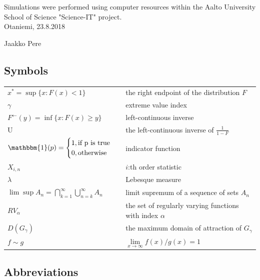 \documentclass[english,12pt,a4paper,pdftex,sci,utf8]{aaltothesis} %
\begin{document}


Simulations were performed using computer resources within the Aalto University School of Science "Science-IT" project.\\

\vspace{5cm}
Otaniemi, 23.8.2018

\vspace{5mm}
{\hfill Jaakko Pere \hspace{1cm}}

\newpage


\thesistableofcontents



\subsection*{Symbols}

\begin{tabular}{ll}
$x^*=\sup\{x : F(x)<1\}$  & the right endpoint of the distribution $F$ \\
$\gamma$ & extreme value index \\
$F^{\leftarrow}(y) = \inf\{x:F(x) \geq y \}$ & left-continuous inverse \\
U & the left-continuous inverse of $\frac{1}{1-F}$ \\
$\mathbbm{1}(p)=
\begin{cases}
1 , \textrm{if p is true}\\
0, \textrm{otherwise}
\end{cases}$ & indicator function \\
$X_{i,n}$ & $i$:th order statistic \\
$\lambda$ & Lebesque measure \\
$\lim \sup A_n = \bigcap_{k=1}^{\infty} \bigcup_{n=k}^{\infty} A_n$ & limit supremum of a sequence of sets $A_n$ \\
$RV_{\alpha}$ & the set of regularly varying functions with index $\alpha$ \\
$D(G_{\gamma})$ & the maximum domain of attraction of $G_{\gamma}$ \\
$f \sim g$ & $\lim\limits_{x \rightarrow \infty} f(x)/g(x)=1$ \\
\end{tabular}


\subsection*{Abbreviations}
\end{document}
